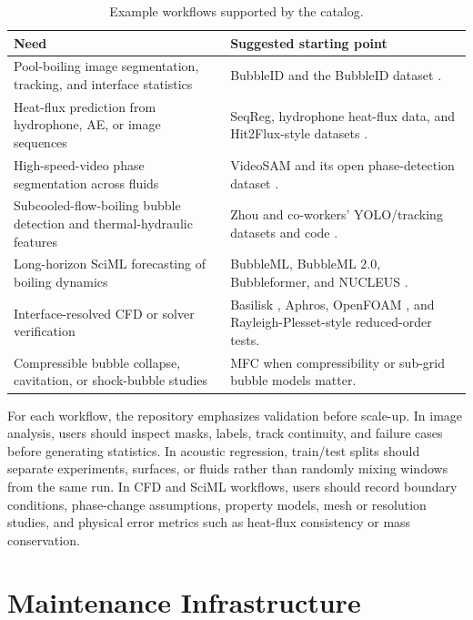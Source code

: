 \documentclass[11pt]{article}
\begin{document}
\begin{table}[t]
\centering
\caption{Example workflows supported by the catalog.}
\label{tab:workflows}
\begin{tabularx}{\linewidth}{@{}lX@{}}
\toprule
Need & Suggested starting point \\
\midrule
Pool-boiling image segmentation, tracking, and interface statistics & BubbleID and the BubbleID dataset \cite{dunlap2024bubbleid}. \\
Heat-flux prediction from hydrophone, AE, or image sequences & SeqReg, hydrophone heat-flux data, and Hit2Flux-style datasets \cite{dunlap2023acoustic,dunlap2025hit2flux}. \\
High-speed-video phase segmentation across fluids & VideoSAM and its open phase-detection dataset \cite{maduabuchi2024videosam}. \\
Subcooled-flow-boiling bubble detection and thermal-hydraulic features & Zhou and co-workers' YOLO/tracking datasets and code \cite{zhou2024subcooled,zhou2025thermalhydraulic}. \\
Long-horizon SciML forecasting of boiling dynamics & BubbleML, BubbleML 2.0, Bubbleformer, and NUCLEUS \cite{hassan2023bubbleml,hassan2025bubbleformer,feeney2026nucleusmoe}. \\
Interface-resolved CFD or solver verification & Basilisk \cite{popinet2009basilisk}, Aphros, OpenFOAM \cite{jasak2007openfoam}, and Rayleigh-Plesset-style reduced-order tests. \\
Compressible bubble collapse, cavitation, or shock-bubble studies & MFC \cite{wilfong2026mfc} when compressibility or sub-grid bubble models matter. \\
\bottomrule
\end{tabularx}
\end{table}

For each workflow, the repository emphasizes validation before scale-up. In image analysis, users should inspect masks, labels, track continuity, and failure cases before generating statistics. In acoustic regression, train/test splits should separate experiments, surfaces, or fluids rather than randomly mixing windows from the same run. In CFD and SciML workflows, users should record boundary conditions, phase-change assumptions, property models, mesh or resolution studies, and physical error metrics such as heat-flux consistency or mass conservation.

\section{Maintenance Infrastructure}
\end{document}

